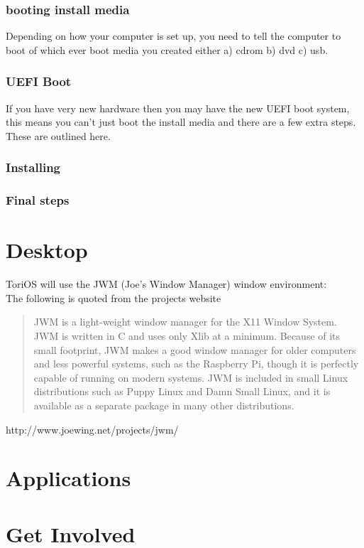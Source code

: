 \documentclass[12pt,a4paper]{book}
\begin{document}
\subsection{booting install media}
Depending on how your computer is set up,  you need to tell the computer to boot of which ever boot media you created either a) cdrom b) dvd c) usb.

\subsection{UEFI Boot}
If you have very new hardware then you may have the new UEFI boot system,  this means you can't just boot the install media and there are a few extra steps.  These are outlined here.
\subsection{Installing}
\subsection{Final steps}
\chapter{Desktop}

ToriOS will use the JWM (Joe's Window Manager) window environment:\\

The following is quoted from the projects website

\begin{quote}
JWM is a light-weight window manager for the X11 Window System. JWM is written in C and uses only Xlib at a minimum. Because of its small footprint, JWM makes a good window manager for older computers and less powerful systems, such as the Raspberry Pi, though it is perfectly capable of running on modern systems. JWM is included in small Linux distributions such as Puppy Linux and Damn Small Linux, and it is available as a separate package in many other distributions. 
\end{quote}
http://www.joewing.net/projects/jwm/

\chapter{Applications}

\chapter{Get Involved}
\end{document}
